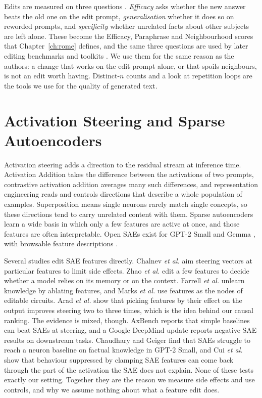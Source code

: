 Edits are measured on three questions \cite{r2}. \emph{Efficacy} asks whether the new answer beats the old one on the edit prompt, \emph{generalisation} whether it does so on reworded prompts, and \emph{specificity} whether unrelated facts about other subjects are left alone. These become the Efficacy, Paraphrase and Neighbourhood scores that Chapter~\ref{ch:rome} defines, and the same three questions are used by later editing benchmarks and toolkits \cite{r3,r32}. We use them for the same reason as the authors: a change that works on the edit prompt alone, or that spoils neighbours, is not an edit worth having. Distinct-$n$ counts \cite{r62} and a look at repetition loops \cite{r61} are the tools we use for the quality of generated text.

\section{Activation Steering and Sparse Autoencoders}

Activation steering adds a direction to the residual stream at inference time. Activation Addition \cite{r9} takes the difference between the activations of two prompts, contrastive activation addition \cite{r10} averages many such differences, and representation engineering \cite{r11} reads and controls directions that describe a whole population of examples. Superposition \cite{r5} means single neurons rarely match single concepts, so these directions tend to carry unrelated content with them. Sparse autoencoders \cite{r6,r7,r8} learn a wide basis in which only a few features are active at once, and those features are often interpretable. Open SAEs exist for GPT-2 Small \cite{r15} and Gemma \cite{r19}, with browsable feature descriptions \cite{r20}.

Several studies edit SAE features directly. Chalnev \textit{et al.} \cite{r28} aim steering vectors at particular features to limit side effects. Zhao \textit{et al.} \cite{r29} edit a few features to decide whether a model relies on its memory or on the context. Farrell \textit{et al.} \cite{r27} unlearn knowledge by ablating features, and Marks \textit{et al.} \cite{r33} use features as the nodes of editable circuits. Arad \textit{et al.} \cite{r23} show that picking features by their effect on the output improves steering two to three times, which is the idea behind our causal ranking. The evidence is mixed, though. AxBench \cite{r12} reports that simple baselines can beat SAEs at steering, and a Google DeepMind update \cite{r24} reports negative SAE results on downstream tasks. Chaudhary and Geiger \cite{r25} find that SAEs struggle to reach a neuron baseline on factual knowledge in GPT-2 Small, and Cui \textit{et al.} \cite{r26} show that behaviour suppressed by clamping SAE features can come back through the part of the activation the SAE does not explain. None of these tests exactly our setting. Together they are the reason we measure side effects and use controls, and why we assume nothing about what a feature edit does.

